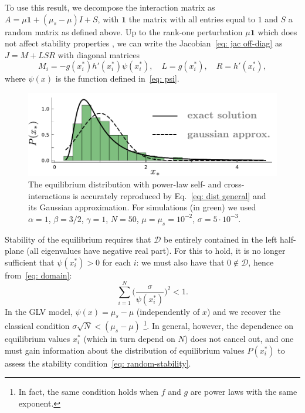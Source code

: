 To use this result, we decompose the interaction matrix as $A = \mu\mathbf{1} + (\mu_s-\mu)I + S$,
with $\mathbf{1}$ the matrix with all entries equal to $1$ and $S$ a random matrix as defined above.
Up to the rank-one perturbation $\mu\mathbf{1}$ which does not affect stability properties \cite{Stone2018}, we can write the Jacobian~\eqref{eq: jac off-diag} as $J = M + LSR$ with diagonal matrices
\begin{equation}
    M_i = - g(x_i^*)h'(x_i^*)\psi(x_i^*),\quad L = g(x_i^*), \quad R = h'(x_i^*),
\end{equation}
where $\psi(x)$ is the function defined in~\eqref{eq: psi}. 
\begin{figure}[t!]
    \includegraphics[width=.45\textwidth]{figs/cavity.pdf}
    \caption{The equilibrium distribution with power-law self- and cross-interactions is accurately reproduced by 
    Eq.~\eqref{eq: dist general} and its Gaussian approximation.
    For simulations (in green) we used $\alpha=1$, $\beta=3/2$,
    $\gamma=1$, $N=50$, $\mu=\mu_s=10^{-2}$, $\sigma=5\cdot 10^{-3}$.}
    \label{fig: cavity sol.}
\end{figure}
Stability of the equilibrium requires that $\mathcal{D}$ be entirely contained in the left half-plane (all eigenvalues have negative real part). For this to hold, it is no longer sufficient that $\psi(x_i^*) > 0$ for each $i$: we must also have that $0\notin \mathcal{D}$, hence from~\eqref{eq: domain}:
\begin{equation}
    \sum_{i=1}^N \Big(\frac{\sigma}{\psi(x_i^*)}\Big)^{2}
    < 1.
    \label{eq: random-stability}
\end{equation}
In the GLV model, $\psi(x) = \mu_s - \mu$ (independently of $x$) and we recover the classical condition $\sigma\sqrt{N} < (\mu_s-\mu)$ \footnote{In fact, the same condition holds when $f$ and $g$ are power laws with the same exponent.}. In general, however, the dependence on equilibrium values $x_i^*$ (which in turn depend on $N$) does not cancel out, and one must gain information about the distribution of equilibrium values $P(x_i^*)$ to assess the stability condition~\eqref{eq: random-stability}.
